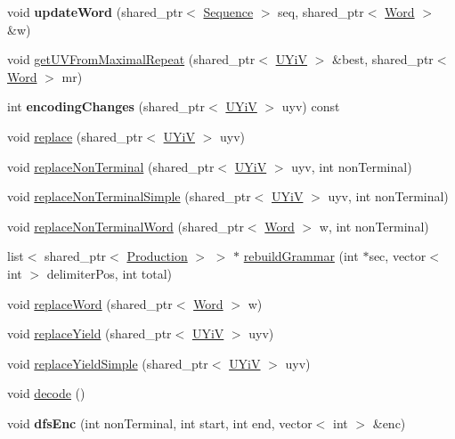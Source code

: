 \begin{DoxyCompactItemize}
\item 
\hypertarget{classDencoder_a4ee6f71a4466a853b19a78457c787c0c}{void {\bfseries update\-Word} (shared\-\_\-ptr$<$ \hyperlink{classSequence}{Sequence} $>$ seq, shared\-\_\-ptr$<$ \hyperlink{classWord}{Word} $>$ \&w)}\label{classDencoder_a4ee6f71a4466a853b19a78457c787c0c}

\item 
void \hyperlink{classDencoder_a1482876f6aa77c3d06aea0ded13b6a22}{get\-U\-V\-From\-Maximal\-Repeat} (shared\-\_\-ptr$<$ \hyperlink{classUYiV}{U\-Yi\-V} $>$ \&best, shared\-\_\-ptr$<$ \hyperlink{classWord}{Word} $>$ mr)
\item 
\hypertarget{classDencoder_aaa99f2ab3e47c3b7c40deb5c1eecc2f8}{int {\bfseries encoding\-Changes} (shared\-\_\-ptr$<$ \hyperlink{classUYiV}{U\-Yi\-V} $>$ uyv) const }\label{classDencoder_aaa99f2ab3e47c3b7c40deb5c1eecc2f8}

\item 
void \hyperlink{classDencoder_a6f277d3bf91144be89643626214c798e}{replace} (shared\-\_\-ptr$<$ \hyperlink{classUYiV}{U\-Yi\-V} $>$ uyv)
\item 
void \hyperlink{classDencoder_af79918dee8bfe223023356f586d6f21e}{replace\-Non\-Terminal} (shared\-\_\-ptr$<$ \hyperlink{classUYiV}{U\-Yi\-V} $>$ uyv, int non\-Terminal)
\item 
void \hyperlink{classDencoder_a6a796494a7caed55b71dd8c3e725ce3b}{replace\-Non\-Terminal\-Simple} (shared\-\_\-ptr$<$ \hyperlink{classUYiV}{U\-Yi\-V} $>$ uyv, int non\-Terminal)
\item 
void \hyperlink{classDencoder_a40dec7fcc058dbb18a7ee3f5729c5d95}{replace\-Non\-Terminal\-Word} (shared\-\_\-ptr$<$ \hyperlink{classWord}{Word} $>$ w, int non\-Terminal)
\item 
list$<$ shared\-\_\-ptr$<$ \hyperlink{classProduction}{Production} $>$ $>$ $\ast$ \hyperlink{classDencoder_a4a83e4396020fc47b969af504f3f4dee}{rebuild\-Grammar} (int $\ast$sec, vector$<$ int $>$ delimiter\-Pos, int total)
\item 
void \hyperlink{classDencoder_a58efab8245727d4cf284964907e047f8}{replace\-Word} (shared\-\_\-ptr$<$ \hyperlink{classWord}{Word} $>$ w)
\item 
void \hyperlink{classDencoder_aeda162ad58a07d6472878bf6dc31245e}{replace\-Yield} (shared\-\_\-ptr$<$ \hyperlink{classUYiV}{U\-Yi\-V} $>$ uyv)
\item 
void \hyperlink{classDencoder_a02caefcb12787c42d483e3fc3280441d}{replace\-Yield\-Simple} (shared\-\_\-ptr$<$ \hyperlink{classUYiV}{U\-Yi\-V} $>$ uyv)
\item 
void \hyperlink{classDencoder_ac54580ccea343b815ae0790d0d671a0c}{decode} ()
\item 
\hypertarget{classDencoder_aed77f2f64705826f2d91d2959da55761}{void {\bfseries dfs\-Enc} (int non\-Terminal, int start, int end, vector$<$ int $>$ \&enc)}\label{classDencoder_aed77f2f64705826f2d91d2959da55761}


\end{DoxyCompactItemize}

